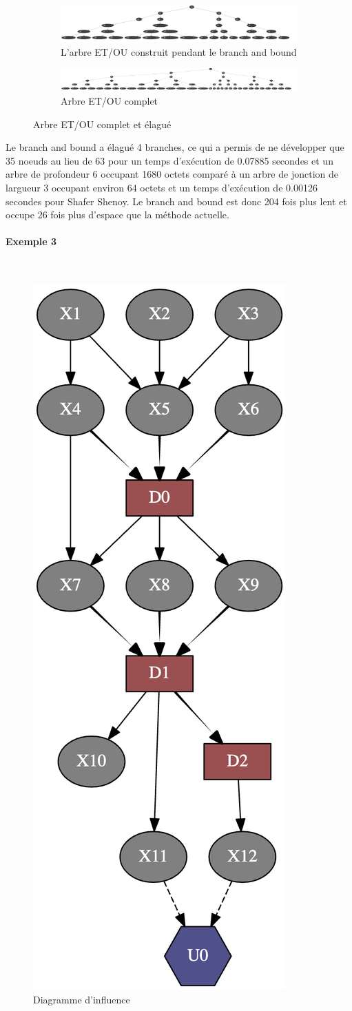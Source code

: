 \documentclass[12pt]{article}
\newcommand{\subsubsubsection}[1]{\paragraph{#1}\mbox{}\\}
\begin{document}
\begin{figure}[ht]
\centering
\begin{subfigure}{.5\textwidth}
  \centering
  \includegraphics[width=1\linewidth]{docs/ressources_rapport/EXEMPLE2ANDOR.png}
  \caption{L'arbre ET/OU construit pendant le branch and bound}
  \label{fig:sub5}
\end{subfigure}%
\begin{subfigure}{.5\textwidth}
  \centering
  \includegraphics[width=1\linewidth]{docs/ressources_rapport/EXEMPLE2FULLANDOR.png}
  \caption{Arbre ET/OU complet}
  \label{fig:sub6}
\end{subfigure}
\caption{Arbre ET/OU complet et élagué}
\label{fig:test2}
\end{figure}

Le branch and bound a élagué 4 branches, ce qui a permis de ne développer que 35 noeuds au lieu de 63 pour un temps d'exécution de 0.07885 secondes et un arbre de profondeur 6 occupant 1680 octets comparé à un arbre de jonction de largueur 3 occupant environ 64 octets et un temps d'exécution de 0.00126 secondes pour Shafer Shenoy. Le branch and bound est donc 204 fois plus lent et occupe 26 fois plus d'espace que la méthode actuelle.
\pagebreak
\subsubsubsection{Exemple 3}
\begin{figure}[ht]
\centering
\includegraphics[width=0.2\linewidth]{docs/ressources_rapport/id3.png}
 \caption{Diagramme d'influence}
\end{figure}
\end{document}
